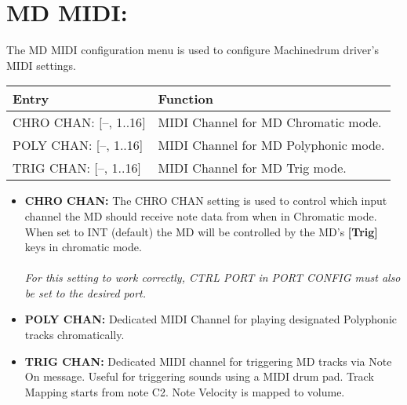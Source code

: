 \newpage

\section{MD MIDI:}
The MD MIDI configuration menu is used to configure Machinedrum driver's MIDI settings.
\\
\begin{tabular}{|l|l|}
\hline
\rowcolor[HTML]{C0C0C0} 
Entry                                  & Function                                                                       \\ \hline
CHRO CHAN: {[}--, 1..16{]}        & MIDI Channel for MD Chromatic mode. \\ \hline
POLY CHAN: {[}--, 1..16{]}         & MIDI Channel for MD Polyphonic mode. \\ \hline
TRIG CHAN: {[}--, 1..16{]}        & MIDI Channel for MD Trig mode. \\ \hline
\end{tabular}

\begin{itemize}
\item{\textbf{CHRO CHAN:} The CHRO CHAN setting is used to control which input channel the MD should receive note data from when in Chromatic mode. When set to INT (default) the MD will be controlled by the MD's \textbf{[Trig]} keys in chromatic mode. \\\\\textit{For this setting to work correctly, CTRL PORT in PORT CONFIG must also be set to the desired port.}}

\item{\textbf{POLY CHAN:} Dedicated MIDI Channel for playing designated Polyphonic tracks chromatically.}
\item{\textbf{TRIG CHAN:} Dedicated MIDI channel for triggering MD tracks via Note On message. Useful for triggering sounds using a MIDI drum pad. Track Mapping starts from note C2. Note Velocity is mapped to volume.}
\end{itemize}